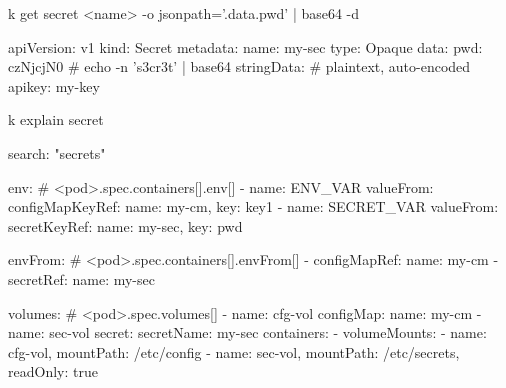 \begin{tcbitemize}[
  raster columns=3, raster equal height=rows,
  blanker, cheat subtitle
]
    \begin{cheatcodebashbold}
    k get secret <name> -o jsonpath='{.data.pwd}' | base64 -d
    \end{cheatcodebashbold}

    \begin{cheatcodebash}
    apiVersion: v1
    kind: Secret
    metadata: {name: my-sec}
    type: Opaque
    data:
      pwd: czNjcjN0   # echo -n 's3cr3t' | base64
    stringData:       # plaintext, auto-encoded
      apikey: my-key
    \end{cheatcodebash}

    \begin{cheatcodebash}
    k explain secret
    \end{cheatcodebash}

    \begin{cheatcodebash}
    search: "secrets"
    \end{cheatcodebash}


  \tcbitem

    \begin{cheatcodebashbold}
    env:                   # <pod>.spec.containers[].env[]
    - name: ENV_VAR
      valueFrom:
        configMapKeyRef: {name: my-cm, key: key1}
    - name: SECRET_VAR
      valueFrom:
        secretKeyRef: {name: my-sec, key: pwd}
    \end{cheatcodebashbold}

    \begin{cheatcodebash}
    envFrom:               # <pod>.spec.containers[].envFrom[]
    - configMapRef: {name: my-cm}
    - secretRef:    {name: my-sec}
    \end{cheatcodebash}

    \begin{cheatcodebashbold}
    volumes:               # <pod>.spec.volumes[]
    - name: cfg-vol
      configMap: {name: my-cm}
    - name: sec-vol
      secret: {secretName: my-sec}
    containers:
    - volumeMounts:
      - {name: cfg-vol, mountPath: /etc/config}
      - {name: sec-vol, mountPath: /etc/secrets,
        readOnly: true}
    \end{cheatcodebashbold}


\end{tcbitemize}
